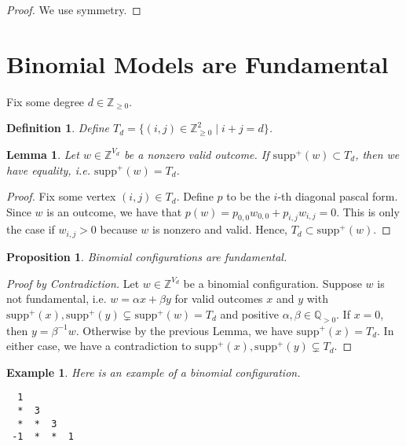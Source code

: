 \documentclass[11pt]{article}
\newtheorem{proposition}[theorem]{Proposition}
\newtheorem{lemma}[theorem]{Lemma}
\newtheorem{definition}[theorem]{Definition}
\newtheorem{example}[theorem]{Example}
\begin{document}
\begin{proof}
 We use symmetry. 
\end{proof}

\section{Binomial Models are Fundamental}
Fix some degree $d \in \mathbb{Z}_{\geq 0}$.

\begin{definition}
Define $T_{d} = \{ (i,j) \in \mathbb{Z}^2_{\geq 0} \mid i + j = d \}$.  
\end{definition}

\begin{lemma}
  Let $w \in \mathbb Z^{V_{d}}$ be a nonzero valid outcome. If $\mathrm{supp}^+(w) \subset T_{d}$, then we have equality, i.e. $\mathrm{supp}^+(w) = T_{d}$.
\end{lemma}

\begin{proof}
 Fix some vertex $(i,j) \in T_d$. Define $p$ to be the $i$-th diagonal pascal form. Since $w$ is an outcome, we have that $p(w) = p_{0,0} w_{0,0} + p_{i,j}w_{i,j} = 0$. This is only the case if $w_{i,j} > 0$ because $w$ is nonzero and valid. Hence, $T_{d} \subset \mathrm{supp}^+(w)$.
\end{proof}

\begin{proposition}
  Binomial configurations are fundamental.
\end{proposition}

\begin{proof}[Proof by Contradiction]
  Let $w \in \mathbb Z^{V_{d}}$ be a binomial configuration. Suppose $w$ is not fundamental, i.e. $w = \alpha x + \beta y$ for valid outcomes $x$ and $y$ with $\mathrm{supp}^+(x), \mathrm{supp}^+(y) \subsetneq \mathrm{supp}^+(w) = T_{d}$ and positive $\alpha, \beta \in \mathbb Q_{>0}$. 
  If $x = 0$, then $y = \beta^{-1}w$. Otherwise by the previous Lemma, we have $\mathrm{supp}^+(x) = T_{d}$. 
  In either case, we have a contradiction to $\mathrm{supp}^+(x), \mathrm{supp}^+(y) \subsetneq T_{d}$. 
\end{proof}

\begin{example}
  Here is an example of a binomial configuration.
 \begin{verbatim}
  1
  *  3
  *  *  3
 -1  *  *  1
 \end{verbatim} 
\end{example}
\end{document}
